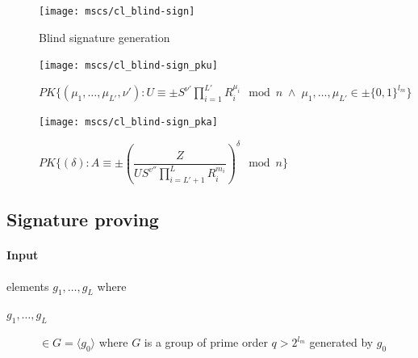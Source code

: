 
\begin{figure}[ht]
  \centering
  \texttt{[image: mscs/cl\_blind-sign]}
  \caption{Blind signature generation}
  \label{msc:cl_blind-sign}
\end{figure}

\begin{figure}[ht]
  \centering
  \texttt{[image: mscs/cl\_blind-sign\_pku]}
  \caption{$PK\{(\mu_1, \dots, \mu_{L'}, \nu') :
    U \equiv \pm S^{\nu'} \prod_{i=1}^{L'} R_i^{\mu_i} \mod n \;\land\; \mu_1, \dots, \mu_{L'} \in \pm\{0,1\}^{l_m} \}$}
  \label{msc:cl_blind-sign_pku}
\end{figure}

\begin{figure}[ht]
  \centering
  \texttt{[image: mscs/cl\_blind-sign\_pka]}
  \caption{$PK\{(\delta) :
  A \equiv \pm \left(\dfrac{Z}{U S^{v''} \prod_{i=L'+1}^{L} R_i^{m_i}} \right)^{\delta} \mod n \}$}
  \label{msc:cl_blind-sign_pka}
\end{figure}

\subsection{Signature proving}\label{sec:cl_proof}


\paragraph{Input} elements $g_1, \dots, g_L$ where
\begin{description}
  \item[$g_1, \dots, g_L$] $\in G = \langle g_0 \rangle$ where $G$ is a group of prime order $q > 2^{l_m}$ generated by $g_0$
\end{description}

